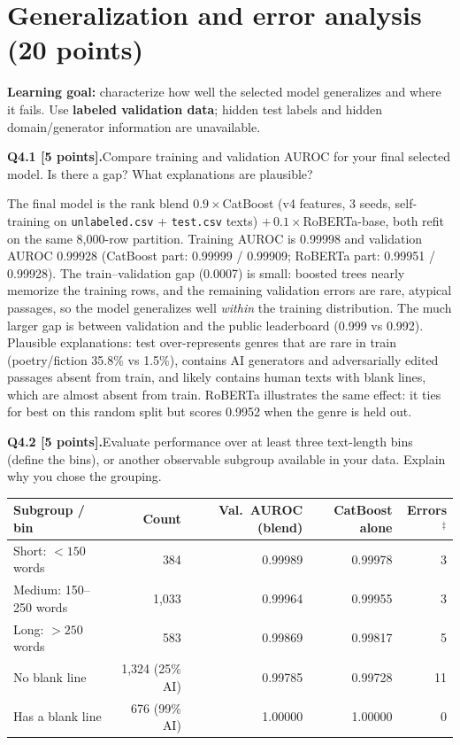 \documentclass[11pt,letterpaper]{article}
\newcommand{\question}[2]{\needspace{4\baselineskip}\par\addvspace{0.45em}\noindent\textbf{#1}\quad #2\par\nobreak\vspace{0.1em}}
\begin{document}
\newpage
\section{Generalization and error analysis (20 points)}
\textbf{Learning goal:} characterize how well the selected model generalizes and where it fails. Use \textbf{labeled validation data}; hidden test labels and hidden domain/generator information are unavailable.

\question{Q4.1 [5 points].}{Compare training and validation AUROC for your final selected model. Is there a gap? What explanations are plausible?}
The final model is the rank blend $0.9\times$CatBoost (v4 features, 3 seeds, self-training on \texttt{unlabeled.csv} + \texttt{test.csv} texts) $+\,0.1\times$RoBERTa-base, both refit on the same 8,000-row partition. Training AUROC is 0.99998 and validation AUROC 0.99928 (CatBoost part: 0.99999 / 0.99909; RoBERTa part: 0.99951 / 0.99928). The train--validation gap (0.0007) is small: boosted trees nearly memorize the training rows, and the remaining validation errors are rare, atypical passages, so the model generalizes well \emph{within} the training distribution. The much larger gap is between validation and the public leaderboard (0.999 vs 0.992). Plausible explanations: test over-represents genres that are rare in train (poetry/fiction 35.8\% vs 1.5\%), contains AI generators and adversarially edited passages absent from train, and likely contains human texts with blank lines, which are almost absent from train. RoBERTa illustrates the same effect: it ties for best on this random split but scores 0.9952 when the genre is held out.
\question{Q4.2 [5 points].}{Evaluate performance over at least three text-length bins (define the bins), or another observable subgroup available in your data. Explain why you chose the grouping.}
\begin{tabularx}{\linewidth}{@{}Yrrrr@{}}\toprule Subgroup / bin & Count & Val.\ AUROC (blend) & CatBoost alone & Errors$^\ddagger$ \\ \midrule
Short: $<150$ words & 384 & 0.99989 & 0.99978 & 3 \\
Medium: 150--250 words & 1,033 & 0.99964 & 0.99955 & 3 \\
Long: $>250$ words & 583 & 0.99869 & 0.99817 & 5 \\ \midrule
No blank line & 1,324 (25\% AI) & 0.99785 & 0.99728 & 11 \\
Has a blank line & 676 (99\% AI) & 1.00000 & 1.00000 & 0 \\ \bottomrule\end{tabularx}
\end{document}
